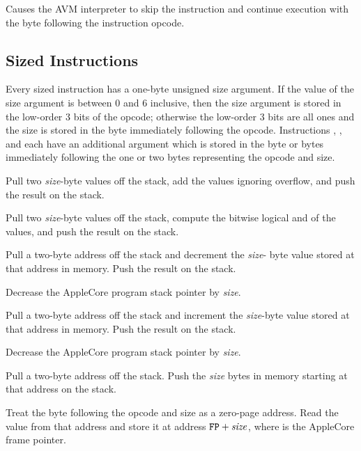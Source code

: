 \documentclass[10pt]{article}
\begin{document}
%
Causes the AVM interpreter to skip the instruction and
continue execution with the byte following the instruction
opcode.

\subsection{Sized Instructions}

Every sized instruction has a one-byte unsigned size argument.
If the value of the size argument is between 0 and 6 inclusive,
then the size argument is stored in the low-order 3 bits of the
opcode; otherwise the low-order 3 bits are all
ones and the size is stored in the byte immediately following
the opcode.  Instructions , , and 
each have an additional
argument which is stored in the byte or bytes immediately
following the one or two bytes representing the opcode and
size.

 Pull two \emph{size}-byte
values off the stack, add the values ignoring overflow, and push the
result on the stack.

 Pull two
\emph{size}-byte values off the stack, compute the bitwise logical and
of the values, and push the result on the stack.

 Pull a two-byte
address off the stack and decrement the \emph{size}- byte value stored
at that address in memory.  Push the result on the stack.

Decrease the AppleCore program stack pointer by \emph{size}.

 Pull a two-byte address
off the stack and increment the \emph{size}-byte value stored at that
address in memory.  Push the result on the stack.

Decrease the AppleCore program stack pointer by \emph{size}.

Pull a two-byte address off the stack. Push the \emph{size}
bytes in memory starting at that address on the stack.

Treat the byte following the opcode and size as a zero-page
address.  Read the value from that address and store it
at address $\texttt{FP}+\mbox{\textit{size}}$, where  is the
AppleCore frame pointer.
\end{document}
